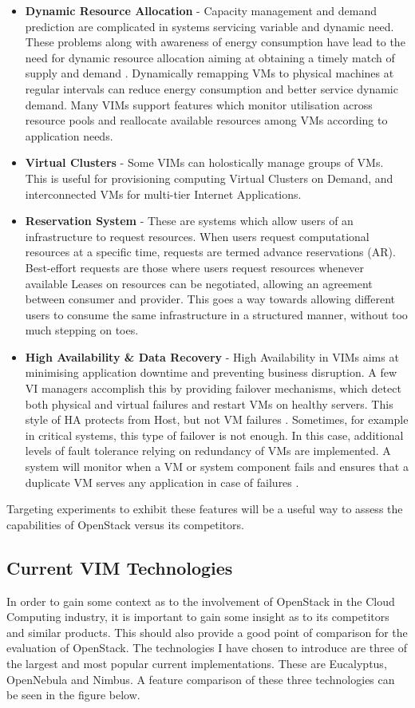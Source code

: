 \begin{itemize}
\item \textbf{Dynamic Resource Allocation} - Capacity management and demand prediction are complicated in systems servicing variable and dynamic need. These problems along with awareness of energy consumption have lead to the need for dynamic resource allocation aiming at obtaining a timely match of supply and demand \cite{capacitymanagement}. Dynamically remapping VMs to physical machines at regular intervals can reduce energy consumption and better service dynamic demand. Many VIMs support features which monitor utilisation across resource pools and reallocate available resources among VMs according to application needs. 
\item \textbf{Virtual Clusters} - Some VIMs can holostically manage groups of VMs. This is useful for provisioning computing Virtual Clusters on Demand, and interconnected VMs for multi-tier Internet Applications\cite{oneclickvirtualclusters}.
\item \textbf{Reservation System} - These are systems which allow users of an infrastructure to request resources. When users request computational resources at a specific time, requests are termed advance reservations (AR). Best-effort requests are those where users request resources whenever available\cite{batchexecutionleasing} Leases on resources can be negotiated, allowing an agreement between consumer and provider. This goes a way towards allowing different users to consume the same infrastructure in a structured manner, without too much stepping on toes. 
\item \textbf{High Availability \& Data Recovery} - High Availability in VIMs aims at minimising application downtime and preventing business disruption. A few VI managers accomplish this by providing failover mechanisms, which detect both physical and virtual failures and restart VMs on healthy servers. This style of HA protects from Host, but not VM failures \cite{vmwarehighav}\cite{citrixhighav}. Sometimes, for example in critical systems, this type of failover is not enough. In this case, additional levels of fault tolerance relying on redundancy of VMs are implemented. A system will monitor when a VM or system component fails and ensures that a duplicate VM serves any application in case of failures \cite{citrixhighav}.     
\end{itemize}
Targeting experiments to exhibit these features will be a useful way to assess the capabilities of OpenStack versus its competitors. 

\subsection{Current VIM Technologies}
In order to gain some context as to the involvement of OpenStack in the Cloud Computing industry, it is important to gain some insight as to its competitors and similar products. This should also provide a good point of comparison for the evaluation of OpenStack. 
The technologies I have chosen to introduce are three of the largest and most popular current implementations. These are Eucalyptus, OpenNebula and Nimbus. A feature comparison of these three technologies can be seen in the figure below. 

